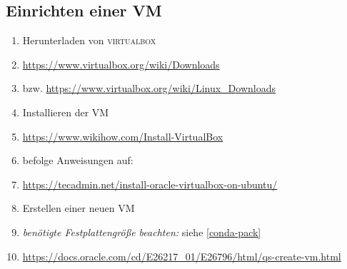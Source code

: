 \documentclass[
a4paper,     %
12pt         %
]{scrartcl}  %
\begin{document}
\subsection{Einrichten einer VM}
\begin{enumerate}
	\item Herunterladen von \textsc{virtualbox}
	\item[] \url{https://www.virtualbox.org/wiki/Downloads}
	\item[] bzw. \url{https://www.virtualbox.org/wiki/Linux_Downloads}
	\item Installieren der VM
	\item[] \url{https://www.wikihow.com/Install-VirtualBox}

	\item[] befolge Anweisungen auf:
	\item[] \url{https://tecadmin.net/install-oracle-virtualbox-on-ubuntu/}

	\item Erstellen einer neuen VM
	\item[] \textit{benötigte Festplattengröße beachten:} siehe \ref{conda-pack}
	\item[] \url{https://docs.oracle.com/cd/E26217_01/E26796/html/qs-create-vm.html}
\end{enumerate}
\end{document}
